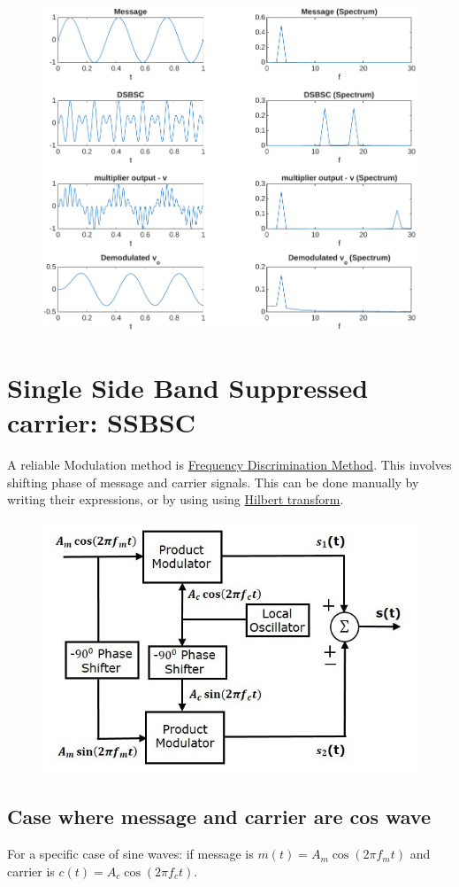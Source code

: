 \begin{figure}[H]
	\centering
	\includegraphics[width=\textwidth]{img/dsbsc.pdf}
\end{figure}

\section{Single Side Band Suppressed carrier: SSBSC}

A reliable Modulation method is  \underline{Frequency Discrimination Method}. This involves shifting phase of message and carrier signals. This can be done manually by writing their expressions, or by using using \href{https://en.wikipedia.org/wiki/Hilbert_transform}{Hilbert transform}.

\begin{figure}[H]
	\centering
	\includegraphics[width=.6\textwidth]{img/phase_disc.jpg}
\end{figure}
\subsection{Case where message and carrier are cos wave}
For a specific case of sine waves: 
if message is $m(t) = A_m \cos\left ( 2 \pi f_mt \right )$ and carrier is $c(t) = A_c \cos\left ( 2 \pi f_ct \right )$.

